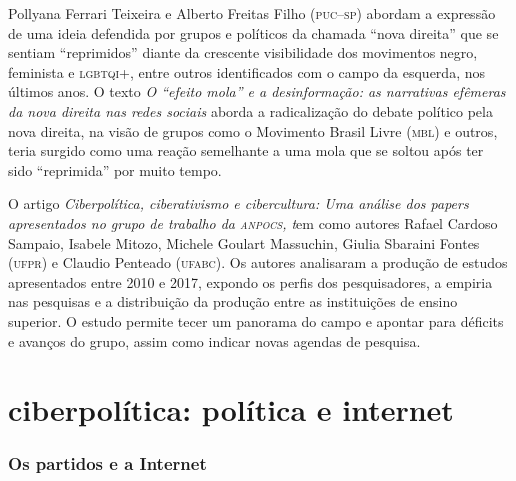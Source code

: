Pollyana Ferrari Teixeira e Alberto Freitas Filho (\textsc{puc--sp}) abordam a
expressão de uma ideia defendida por grupos e políticos da
chamada ``nova direita'' que se sentiam ``reprimidos'' diante da
crescente visibilidade dos movimentos negro, feminista e \textsc{lgbtqi}+, entre
outros identificados com o campo da esquerda, nos últimos anos. O texto
\emph{O ``efeito mola'' e a desinformação: as narrativas efêmeras da
nova direita nas redes sociais} aborda a radicalização do debate
político pela nova direita, na visão de grupos como o Movimento Brasil
Livre (\textsc{mbl}) e outros, teria surgido como uma reação semelhante a uma
mola que se soltou após ter sido ``reprimida'' por muito tempo.

O artigo \emph{Ciberpolítica, ciberativismo e cibercultura: Uma análise
dos papers apresentados no grupo de trabalho da \textsc{\textsc{anpocs}}, t}em como
autores Rafael Cardoso Sampaio, Isabele Mitozo, Michele Goulart
Massuchin, Giulia Sbaraini Fontes (\textsc{ufpr}) e Claudio Penteado (\textsc{ufabc}). Os
autores analisaram a produção de estudos apresentados entre 2010 e 2017,
expondo os perfis dos pesquisadores, a
empiria nas pesquisas e a distribuição da produção entre as
instituições de ensino superior. O estudo permite tecer um panorama do
campo e apontar para déficits e avanços do grupo, assim como indicar
novas agendas de pesquisa.




\part{ciberpolítica: política e internet}




\begin{flushright}
\end{flushright}

\section{Os partidos e a Internet}

